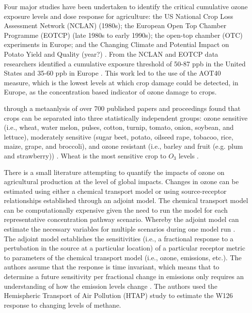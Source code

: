 \documentclass[10pt]{amsart}
\begin{document}
Four major studies have been undertaken to identify the critical cumulative ozone exposure levels and dose response for agriculture: the US National Crop Loss Assessment Network (NCLAN) (1980s); the European Open Top Chamber Programme (EOTCP) (late 1980s to early 1990s); the open-top chamber (OTC) experiments in Europe; and the Changing Climate and Potential Impact on Potato Yield and Quality (year?) \parencite{mills:2007aa}. 
From the NCLAN and EOTCP data researchers identified a cumulative exposure threshold of 50-87 ppb in the United States and 35-60 ppb in Europe \parencite{mills:2007aa}.
This work led to the use of the AOT40 measure, which is the lowest levels at which crop damage could be detected, in Europe, as the concentration based indicator of ozone damage to crops. 

\cite{mills:2007aa} through a metaanlysis of over 700 published papers and proceedings found that crops can be separated into three statistically independent groups: ozone sensitive (i.e., wheat, water melon, pulses, cotton, turnip, tomato, onion, soybean, and lettuce), moderately sensitive (sugar beet, potato, oilseed rape, tobacoo, rice, maize, grape, and broccoli), and ozone resistant (i.e., barley and fruit (e.g. plum and strawberry)) \parencite{mills:2007aa}.  
Wheat is the most sensitive crop to $O_{3}$ levels \parencite{mills:2007aa}. 

There is a small literature attempting to quantify the impacts of ozone on agricultural production at the level of global impacts. 
Changes in ozone can be estimated using either a chemical transport model or using source-receptor relationships established through an adjoint model. 
The chemical transport model can be computationally expensive given the need to run the model for each representative concentration pathway scenario.
Whereby the adjoint model can estimate the necessary variables for multiple scenarios during one model run \parencite{lapina:2015aa}.
The adjoint model establishes the sensitivities (i.e., a fractional response to a pertubation in the source at a particular location) of a particular receptor metric to parameters of the chemical transport model (i.e., ozone, emissions, etc.).
The authors assume that the response is time invariant, which means that to determine a future sensitivity per fractional change in emissions only requires an understanding of how the emission levels change \parencite{lapina:2015aa}.
The authors used the Hemispheric Transport of Air Pollution (HTAP) study to estimate the W126 response to changing levels of methane.
\end{document}
